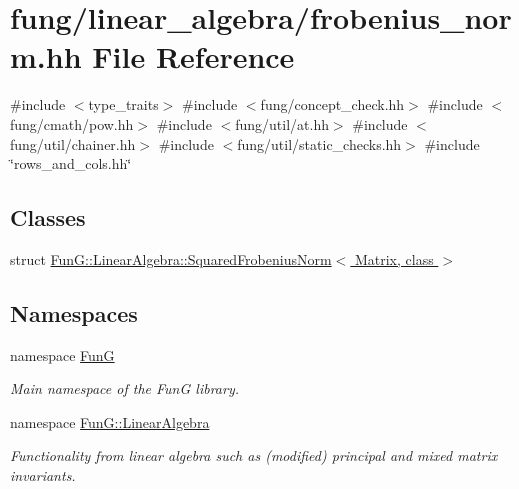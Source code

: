 \hypertarget{frobenius__norm_8hh}{\section{fung/linear\-\_\-algebra/frobenius\-\_\-norm.hh \-File \-Reference}
\label{frobenius__norm_8hh}
}
{\ttfamily \#include $<$type\-\_\-traits$>$}\*
{\ttfamily \#include $<$fung/concept\-\_\-check.\-hh$>$}\*
{\ttfamily \#include $<$fung/cmath/pow.\-hh$>$}\*
{\ttfamily \#include $<$fung/util/at.\-hh$>$}\*
{\ttfamily \#include $<$fung/util/chainer.\-hh$>$}\*
{\ttfamily \#include $<$fung/util/static\-\_\-checks.\-hh$>$}\*
{\ttfamily \#include \char`\"{}rows\-\_\-and\-\_\-cols.\-hh\char`\"{}}\*
\subsection*{\-Classes}
\begin{DoxyCompactItemize}
\item 
struct \hyperlink{structFunG_1_1LinearAlgebra_1_1SquaredFrobeniusNorm}{\-Fun\-G\-::\-Linear\-Algebra\-::\-Squared\-Frobenius\-Norm$<$ Matrix, class $>$}
\end{DoxyCompactItemize}
\subsection*{\-Namespaces}
\begin{DoxyCompactItemize}
\item 
namespace \hyperlink{namespaceFunG}{\-Fun\-G}
\begin{DoxyCompactList}\small\item\em \-Main namespace of the \-Fun\-G library. \end{DoxyCompactList}\item 
namespace \hyperlink{namespaceFunG_1_1LinearAlgebra}{\-Fun\-G\-::\-Linear\-Algebra}
\begin{DoxyCompactList}\small\item\em \-Functionality from linear algebra such as (modified) principal and mixed matrix invariants. \end{DoxyCompactList}\end{DoxyCompactItemize}

